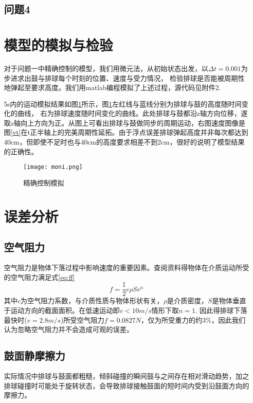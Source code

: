 \documentclass[withoutpreface,bwprint]{cumcmthesis} %
\begin{document}
\subsection{问题4}

\section{模型的模拟与检验}

对于问题一中精确控制的模型，我们用微元法，从初始状态出发，以$\Delta t=0.001$为步进求出鼓与排球每个时刻的位置、速度与受力情况，
检验排球是否能被周期性地弹起至要求高度。我们用matlab编程模拟了上述过程，源代码见附件2.

5s内的运动模拟结果如图\ref{fig:moni}所示，图\ref{fig:moni}左红线与蓝线分别为排球与鼓的高度随时间变化的曲线，
右为排球速度随时间变化的曲线。此处排球与鼓都沿z轴方向位移，遂取z轴向上方向为正。从图上可看出排球与鼓做同步的周期运动，右图速度图像是图\ref{vt}在t正半轴上的完美周期性延拓。由于浮点误差排球弹起高度并非每次都达到40cm，但即使不足时也与40cm的高度要求相差不到2cm，很好的说明了模型结果的正确性。

\begin{figure}[h]
	\centering
	\texttt{[image: moni.png]}
	\caption{精确控制模拟}
	\label{fig:moni}
\end{figure}

\section{误差分析}

\subsection{空气阻力}
空气阻力是物体下落过程中影响速度的重要因素。查阅资料得物体在介质运动所受的空气阻力满足式\ref{eq:ff}
\begin{equation}
	f=\frac{1}{2}c\rho Sv^n
	\label{eq:ff}
\end{equation}
其中$c$为空气阻力系数，与介质性质与物体形状有关，$\rho$是介质密度，$S$是物体垂直于运动方向的截面面积。在低速运动即$v<10m/s$情形下取$n=1$. 因此得排球下落最快时($v=2.8m/s$)所受空气阻力$f=0.0827N$，仅为所受重力的约$3\%$，因此我们认为忽略空气阻力并不会造成可观的误差。

\subsection{鼓面静摩擦力}
实际情况中排球与鼓面都粗糙，倾斜碰撞的瞬间鼓与之间存在相对滑动趋势，加之排球碰撞时可能处于旋转状态，会导致排球接触鼓面的短时间内受到沿鼓面方向的摩擦力。
\end{document}
